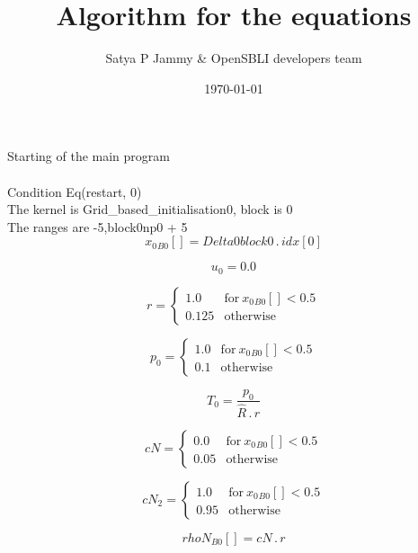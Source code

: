 \documentclass{article}
\title{Algorithm for the equations}
\author{Satya P Jammy \& OpenSBLI developers team}
\date{\today}
\begin{document}
\maketitle
\noindent Starting of the main program\\
\\\noindent Condition Eq(restart, 0)\\\noindent The kernel is Grid_based_initialisation0, block is 0\\\noindent The ranges are -5,block0np0 + 5\\\begin{dmath}{x_{0}{_{B0}}}[{}] = Delta0block0 \,.\, {idx}[{0}]\end{dmath}

\begin{dmath}u_{0} = 0.0\end{dmath}

\begin{dmath}r = \begin{cases} 1.0 & \text{for}\: {x_{0}{_{B0}}}[{}] < 0.5 \\0.125 & \text{otherwise} \end{cases}\end{dmath}

\begin{dmath}p_{0} = \begin{cases} 1.0 & \text{for}\: {x_{0}{_{B0}}}[{}] < 0.5 \\0.1 & \text{otherwise} \end{cases}\end{dmath}

\begin{dmath}T_{0} = \frac{p_{0}}{\hat{R} \,.\, r}\end{dmath}

\begin{dmath}cN = \begin{cases} 0.0 & \text{for}\: {x_{0}{_{B0}}}[{}] < 0.5 \\0.05 & \text{otherwise} \end{cases}\end{dmath}

\begin{dmath}cN_{2} = \begin{cases} 1.0 & \text{for}\: {x_{0}{_{B0}}}[{}] < 0.5 \\0.95 & \text{otherwise} \end{cases}\end{dmath}

\begin{dmath}{rhoN{_{B0}}}[{}] = cN \,.\, r\end{dmath}
\end{document}

